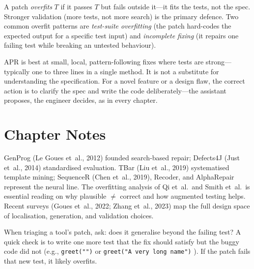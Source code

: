\begin{definition}
A patch \emph{overfits} $T$ if it passes $T$ but fails outside it---it fits the tests, not the spec. Stronger validation (more tests, not more search) is the primary defence. Two common overfit patterns are \emph{test-suite overfitting} (the patch hard-codes the expected output for a specific test input) and \emph{incomplete fixing} (it repairs one failing test while breaking an untested behaviour).
\end{definition}

\begin{remark}
APR is best at small, local, pattern-following fixes where tests are strong---typically one to three lines in a single method. It is not a substitute for understanding the specification. For a novel feature or a design flaw, the correct action is to clarify the spec and write the code deliberately---the assistant proposes, the engineer decides, as in every chapter.
\end{remark}

\section{Chapter Notes}
GenProg (Le Goues et~al., 2012) founded search-based repair; Defects4J (Just et~al., 2014) standardised evaluation. TBar (Liu et~al., 2019) systematised template mining; SequenceR (Chen et~al., 2019), Recoder, and AlphaRepair represent the neural line. The overfitting analysis of Qi et~al.\ and Smith et~al.\ is essential reading on why plausible $\neq$ correct and how augmented testing helps. Recent surveys (Goues et~al., 2022; Zhang et~al., 2023) map the full design space of localisation, generation, and validation choices.

\begin{remark}
When triaging a tool's patch, ask: does it generalise beyond the failing test? A quick check is to write one more test that the fix should satisfy but the buggy code did not (e.g., \texttt{greet("")} or \texttt{greet("A very long name")} ). If the patch fails that new test, it likely overfits.
\end{remark}

